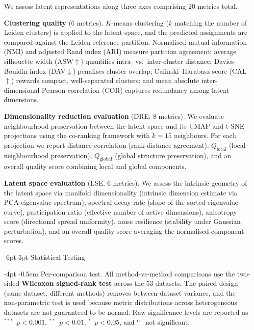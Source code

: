\documentclass[preprint,12pt]{elsarticle}
\makeatletter
\renewcommand\subsection{\@startsection{subsection}{2}{\z@}%
  {-6pt \@plus -2pt \@minus -2pt}%
  {3pt \@plus 1pt \@minus 1pt}%
  {\normalfont\large\bfseries}}
\renewcommand\paragraph{\@startsection{paragraph}{4}{\z@}%
  {-4pt \@plus -1pt \@minus -1pt}%
  {-0.5em}%
  {\normalfont\normalsize\bfseries}}
\newcommand{\sigA}{$^{***}$}     %
\newcommand{\sigB}{$^{**}$}      %
\newcommand{\sigC}{$^{*}$}       %
\newcommand{\ns}{$^{\text{ns}}$} %
\makeatother
\begin{document}
We assess latent representations along three axes comprising 20 metrics
total.

\textbf{Clustering quality} (6 metrics).
$K$-means clustering ($k$ matching the number of Leiden clusters) is
applied to the latent space, and the predicted assignments are compared
against the Leiden reference partition.
Normalised mutual information (NMI) and adjusted Rand index (ARI)
measure partition agreement; average silhouette width
(ASW$\uparrow$) quantifies intra- vs.\ inter-cluster distance;
Davies--Bouldin index (DAV$\downarrow$) penalises cluster overlap;
Calinski--Harabasz score (CAL$\uparrow$) rewards compact, well-separated
clusters; and mean absolute inter-dimensional Pearson correlation (COR)
captures redundancy among latent dimensions.

\textbf{Dimensionality reduction evaluation} (DRE, 8 metrics).
We evaluate neighbourhood preservation between the latent space and its
UMAP and t-SNE projections using the co-ranking framework with
$k{=}15$ neighbours.
For each projection we report distance correlation (rank-distance
agreement), $Q_\text{local}$ (local neighbourhood preservation),
$Q_\text{global}$ (global structure preservation), and an overall quality
score combining local and global components.

\textbf{Latent space evaluation} (LSE, 6 metrics).
We assess the intrinsic geometry of the latent space via
manifold dimensionality (intrinsic dimension estimate via PCA eigenvalue
spectrum), spectral decay rate (slope of the sorted eigenvalue curve),
participation ratio (effective number of active dimensions),
anisotropy score (directional spread uniformity), noise resilience
(stability under Gaussian perturbation), and an overall quality score
averaging the normalised component scores.

\subsection{Statistical Testing}

\paragraph{Per-comparison test.}
All method-vs-method comparisons use the two-sided
\textbf{Wilcoxon signed-rank test} across the 53 datasets.
The paired design (same dataset, different methods) removes
between-dataset variance, and the non-parametric test is used because
metric distributions across heterogeneous datasets are not guaranteed
to be normal.
Raw significance levels are reported as
\sigA~$p < 0.001$, \sigB~$p < 0.01$, \sigC~$p < 0.05$, and
\ns~not significant.
\end{document}
